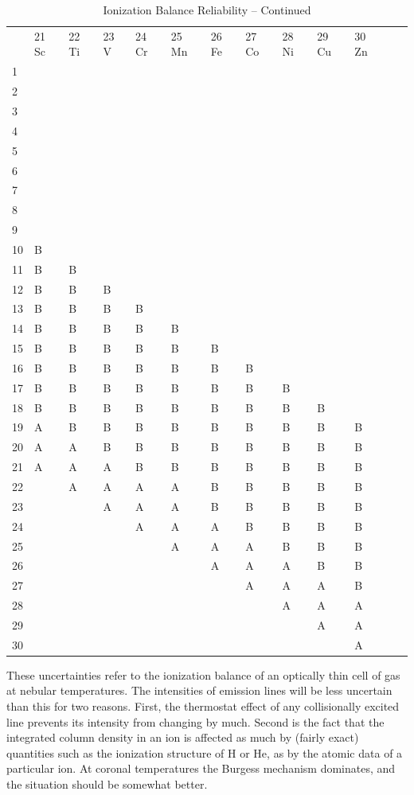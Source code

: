\begin{table}
\addtocounter{table}{-1}
\begin{center}
\caption{Ionization Balance Reliability -- Continued}
\begin{tabular}{lllllllllllll}
\hline
&21 Sc&22 Ti&23 V&24 Cr&25 Mn&26 Fe&27 Co&28 Ni&29 Cu&30
Zn&\\
1\\
2\\
3\\
4\\
5\\
6\\
7\\
8\\
9\\
10&B\\
11&B&B\\
12&B&B&B&\\
13&B&B&B&B\\
14&B&B&B&B&B\\
15&B&B&B&B&B&B\\
16&B&B&B&B&B&B&B\\
17&B&B&B&B&B&B&B&B\\
18&B&B&B&B&B&B&B&B&B\\
19&A&B&B&B&B&B&B&B&B&B\\
20&A&A&B&B&B&B&B&B&B&B\\
21&A&A&A&B&B&B&B&B&B&B\\
22&&A&A&A&A&B&B&B&B&B\\
23&&&A&A&A&B&B&B&B&B\\
24&&&&A&A&A&B&B&B&B\\
25&&&&&A&A&A&B&B&B\\
26&&&&&&A&A&A&B&B\\
27&&&&&&&A&A&A&B\\
28&&&&&&&&A&A&A\\
29&&&&&&&&&A&A\\
30&&&&&&&&&&A\\
\hline
\end{tabular}
\end{center}
\end{table}

These uncertainties refer to the ionization balance of an optically thin
cell of gas at nebular temperatures.  The intensities of emission lines
will be less uncertain than this for two reasons. First, the thermostat
effect of any collisionally excited line prevents its intensity from changing
by much.  Second is the fact that the integrated column density in an ion
is affected as much by (fairly exact) quantities such as the ionization
structure of H or He, as by the atomic data of a particular ion.  At coronal
temperatures the Burgess mechanism dominates, and the situation should be
somewhat better.

